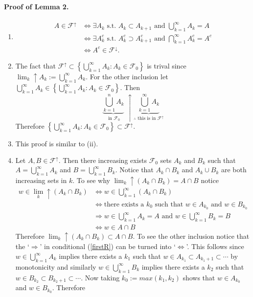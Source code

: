 \documentclass[10pt,letterpaper]{article}
\begin{document}
\paragraph{Proof of Lemma 2.}
\begin{enumerate}
\item 
\begin{align*}
A\in \mathcal F^\uparrow &\Longleftrightarrow \exists A_k \text{  s.t. } A_k\subset A_{k+1}\text{ and  } \bigcup_{k=1}^\infty A_k = A \\
&\Longleftrightarrow \exists A^c_k \text{  s.t. } A^c_k\supset A^c_{k+1}\text{ and } \bigcap_{k=1}^\infty A_k^c = A^c \\
&\Longleftrightarrow A^c\in \mathcal F^\downarrow.
\end{align*}
\item The fact that $\mathcal F^\uparrow \subset \left\{ \bigcup_{k=1}^\infty A_k \colon A_k\in \mathcal F_0 \right\}$ is trival since $\lim_k\!\! \uparrow A_k := \bigcup_{k=1}^\infty A_k$. For the other inclusion let $ \bigcup_{k=1}^\infty A_k\in \left\{ \bigcup_{k=1}^\infty A_k \colon A_k\in \mathcal F_0 \right\}$. Then 
\[\underbrace{\bigcup_{k=1}^n A_k}_{\text{ in $\mathcal F_0$}} \,\,\uparrow  \underbrace{\bigcup_{k=1}^\infty A_k}_{\therefore \text{ this is in }\mathcal F^\uparrow}\]
Therefore $\left\{ \bigcup_{k=1}^\infty A_k \colon A_k\in \mathcal F_0 \right\}\subset \mathcal F^\uparrow$.
\item This proof is similar to (ii).
\item  Let $A, B\in \mathcal F^\uparrow$. Then there increasing exists $\mathcal F_0$ sets $A_k$ and $B_k$ such that $A= \bigcup_{k=1}^\infty A_k$ and $B= \bigcup_{k=1}^\infty B_k$. Notice that $A_k\cap B_k$ and $A_k\cup B_k$ are both increasing sets in $k$. To see why $\lim_k\!\!\uparrow (A_k\cap B_k) = A\cap B$ notice
\begin{align}
w\in \lim_k\!\!\uparrow(A_k\cap B_k) 
&\Longleftrightarrow w \in \bigcup_{k=1}^\infty (A_k\cap B_k)\nonumber\\
&\Longleftrightarrow \text{there exists a $k_0$ such that }w \in A_{k_0}\text{ and }w\in B_{k_0}\nonumber\\
&\Longrightarrow w \in \bigcup_{k=1}^\infty A_k=A \text{ and }w \in \bigcup_{k=1}^\infty B_k=B\label{firstR}\\
&\Longleftrightarrow w \in A\cap B\nonumber
\end{align}
Therefore  $\lim_k\!\!\uparrow (A_k\cap B_k) \subset A\cap B$. To see the other inclusion notice that the `$\Longrightarrow$' in conditional (\ref{firstR}) can be turned into  `$\Longleftrightarrow$'. This follows since $w \in \bigcup_{k=1}^\infty A_k$ implies there exists a $k_1$ such that  $w\in A_{k_1}\subset A_{k_1+1}\subset \cdots$ by monotonicity and  similarly $w \in \bigcup_{k=1}^\infty B_k$ implies there exists a $k_2$ such that  $w\in B_{k_2}\subset B_{k_2+1}\subset \cdots$. Now taking $k_0:=max(k_1,k_2)$ shows that $w \in A_{k_0}$ and $w\in B_{k_0}$. Therefore 

\end{enumerate}
\end{document}

